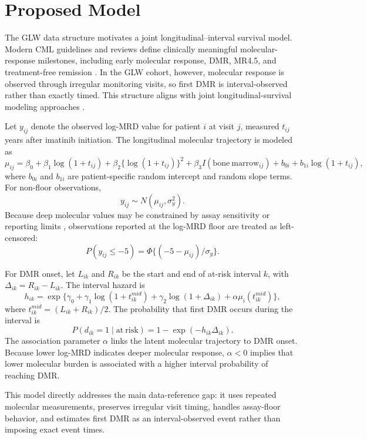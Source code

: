 \section{Proposed Model}

The GLW data structure motivates a joint longitudinal--interval survival model. Modern CML guidelines and reviews define clinically meaningful molecular-response milestones, including early molecular response, DMR, MR4.5, and treatment-free remission \cite{Hochhaus2020ELN,Jabbour2025JAMAReview,Haddad2026Algorithms,Senapati2023CMLManagement,Hughes2014EarlyMolecularResponse,Rasekh2026TFRPredictor,Ono2026MR45}. In the GLW cohort, however, molecular response is observed through irregular monitoring visits, so first DMR is interval-observed rather than exactly timed. This structure aligns with joint longitudinal-survival modeling approaches \cite{Wulfsohn1997JointModel,Rizopoulos2016JMbayes,Lovblom2026MixedObservationJointModel,Niu2026QuantileJointModel}.

Let \(y_{ij}\) denote the observed log-MRD value for patient \(i\) at visit \(j\), measured \(t_{ij}\) years after imatinib initiation. The longitudinal molecular trajectory is modeled as
\[
\mu_{ij} =
\beta_0 + \beta_1 \log(1+t_{ij}) + \beta_2\{\log(1+t_{ij})\}^2
+ \beta_3 I(\mathrm{bone\ marrow}_{ij}) + b_{0i} + b_{1i}\log(1+t_{ij}),
\]
where \(b_{0i}\) and \(b_{1i}\) are patient-specific random intercept and random slope terms. For non-floor observations,
\[
y_{ij}\sim N(\mu_{ij}, \sigma_y^2).
\]
Because deep molecular values may be constrained by assay sensitivity or reporting limits \cite{Kim2026BCRABLqPCR}, observations reported at the log-MRD floor are treated as left-censored:
\[
P(y_{ij}\leq -5)=\Phi\{(-5-\mu_{ij})/\sigma_y\}.
\]

For DMR onset, let \(L_{ik}\) and \(R_{ik}\) be the start and end of at-risk interval \(k\), with \(\Delta_{ik}=R_{ik}-L_{ik}\). The interval hazard is
\[
h_{ik} =
\exp\{\gamma_0 + \gamma_1\log(1+t_{ik}^{mid})
+\gamma_2\log(1+\Delta_{ik})+\alpha\mu_i(t_{ik}^{mid})\},
\]
where \(t_{ik}^{mid}=(L_{ik}+R_{ik})/2\). The probability that first DMR occurs during the interval is
\[
P(d_{ik}=1 \mid \mathrm{at\ risk})=1-\exp(-h_{ik}\Delta_{ik}).
\]
The association parameter \(\alpha\) links the latent molecular trajectory to DMR onset. Because lower log-MRD indicates deeper molecular response, \(\alpha<0\) implies that lower molecular burden is associated with a higher interval probability of reaching DMR.

This model directly addresses the main data-reference gap: it uses repeated molecular measurements, preserves irregular visit timing, handles assay-floor behavior, and estimates first DMR as an interval-observed event rather than imposing exact event times.

